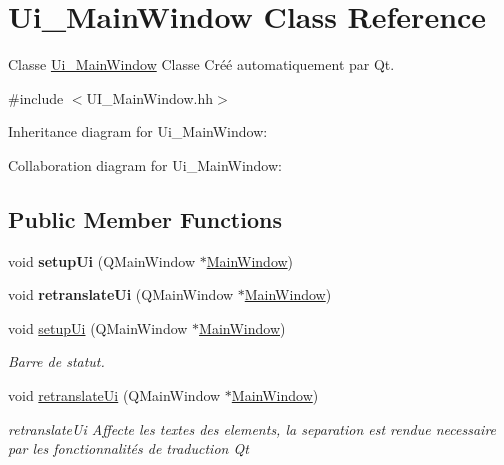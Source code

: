 \hypertarget{classUi__MainWindow}{}\section{Ui\+\_\+\+Main\+Window Class Reference}
\label{classUi__MainWindow}


Classe \hyperlink{classUi__MainWindow}{Ui\+\_\+\+Main\+Window} Classe Cr\'{e}\'{e} automatiquement par Qt.  




{\ttfamily \#include $<$U\+I\+\_\+\+Main\+Window.\+hh$>$}



Inheritance diagram for Ui\+\_\+\+Main\+Window\+:


Collaboration diagram for Ui\+\_\+\+Main\+Window\+:
\subsection*{Public Member Functions}
\begin{DoxyCompactItemize}
\item 
\mbox{\label{classUi__MainWindow_acf4a0872c4c77d8f43a2ec66ed849b58}} 
void {\bfseries setup\+Ui} (Q\+Main\+Window $\ast$\hyperlink{classMainWindow}{Main\+Window})
\item 
\mbox{\label{classUi__MainWindow_a097dd160c3534a204904cb374412c618}} 
void {\bfseries retranslate\+Ui} (Q\+Main\+Window $\ast$\hyperlink{classMainWindow}{Main\+Window})
\item 
void \hyperlink{classUi__MainWindow_acf4a0872c4c77d8f43a2ec66ed849b58}{setup\+Ui} (Q\+Main\+Window $\ast$\hyperlink{classMainWindow}{Main\+Window})
\begin{DoxyCompactList}\small\item\em Barre de statut. \end{DoxyCompactList}\item 
\mbox{\label{classUi__MainWindow_a097dd160c3534a204904cb374412c618}} 
void \hyperlink{classUi__MainWindow_a097dd160c3534a204904cb374412c618}{retranslate\+Ui} (Q\+Main\+Window $\ast$\hyperlink{classMainWindow}{Main\+Window})
\begin{DoxyCompactList}\small\item\em retranslate\+Ui Affecte les textes des elements, la separation est rendue necessaire par les fonctionnalit\'{e}s de traduction Qt \end{DoxyCompactList}\end{DoxyCompactItemize}
